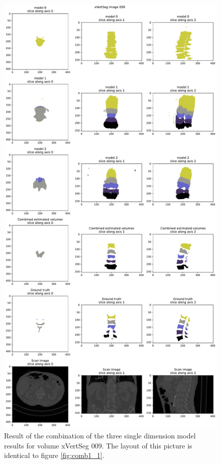 \begin{figure}
    \centering
    \includegraphics[width=.95\textwidth]{images/comb1_denoise2_erode1_xVertSeg_009.pdf}
    \caption{
        Result of the combination of the three single dimension model results for volume xVertSeg 009. The layout of this picture is identical to figure \ref{fig:comb1_1}.\label{fig:comb1_2}
    }
\end{figure}
